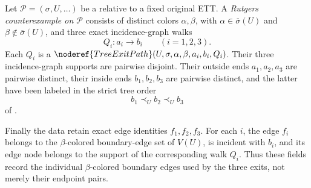 \begin{definition}
Let \(\mathcal P=(\sigma,U,\ldots)\) be a
 relative to a fixed original ETT.
A \emph{Rutgers counterexample on \(\mathcal P\)} consists of distinct
colors \(\alpha,\beta\), with
\(\alpha\in\overline\sigma(U)\) and
\(\beta\notin\overline\sigma(U)\), and three exact incidence-graph walks
\[
       Q_i:a_i\longrightarrow b_i\qquad (i=1,2,3).
\]
Each \(Q_i\) is a
\(\noderef{TreeExitPath}(U,\sigma,\alpha,\beta,a_i,b_i,Q_i)\).
Their three incidence-graph supports are pairwise disjoint.  Their
outside ends \(a_1,a_2,a_3\) are pairwise distinct, their inside ends
\(b_1,b_2,b_3\) are pairwise distinct, and the latter have been labeled
in the strict tree order
\[
                         b_1\prec_U b_2\prec_U b_3
\]
of .

Finally the data retain exact edge identities \(f_1,f_2,f_3\).  For each
\(i\), the edge \(f_i\) belongs to the \(\beta\)-colored boundary-edge
set of \(V(U)\), is incident with \(b_i\), and its edge node belongs to
the support of the corresponding walk \(Q_i\).  Thus these fields record
the individual \(\beta\)-colored boundary edges used by the three exits,
not merely their endpoint pairs.
\end{definition}
